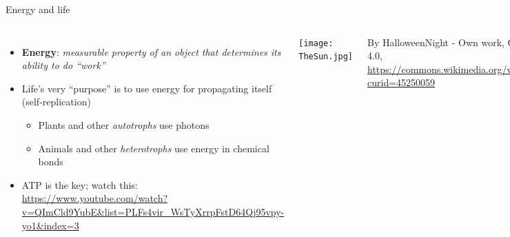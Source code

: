 \begin{frame}{Energy and life}

  \begin{columns}[c]
    \centering
    
    \begin{itemize}[<+->]\setlength{\itemindent}{-1em} \itemsep3pt
      \item {\bf Energy}: {\it measurable property of an object that determines its ability to do ``work''} 
      \item  Life's very ``purpose'' is to use energy for propagating itself (self-replication)
        \begin{itemize}
          \item Plants and other {\it autotrophs} use photons 
          \item Animals and other {\it heterotrophs} use energy in chemical bonds
        \end{itemize}
      \item ATP is the key; watch this: \url{https://www.youtube.com/watch?v=QImCld9YubE&list=PLFs4vir_WsTyXrrpFstD64Qj95vpy-yo1&index=3}    
    \end{itemize}
    \centering
	  \pause
    \texttt{[image: TheSun.jpg]}\\
    {\tiny By HalloweenNight - Own work, CC BY-SA 4.0, \url{https://commons.wikimedia.org/w/index.php?curid=45250059}\par}
	  \begin{itemize}
	    \item The Sun is the {\it ultimate} energy source for {\it most} of life on Earth
	  \end{itemize}
  \end{columns}

\end{frame}

